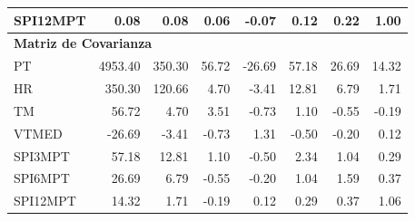 \begin{table}[ht]
\begin{tabular}{lrrrrrrr}
SPI12MPT & 0.08 & 0.08 & 0.06 & -0.07 & 0.12 & 0.22 & 1.00 \\
\midrule
\multicolumn{8}{l}{\textbf{Matriz de Covarianza}} \\
\midrule
PT       & 4953.40 & 350.30 & 56.72 & -26.69 & 57.18 & 26.69 & 14.32 \\
HR       & 350.30 & 120.66 & 4.70 & -3.41 & 12.81 & 6.79 & 1.71 \\
TM       & 56.72 & 4.70 & 3.51 & -0.73 & 1.10 & -0.55 & -0.19 \\
VTMED    & -26.69 & -3.41 & -0.73 & 1.31 & -0.50 & -0.20 & 0.12 \\
SPI3MPT  & 57.18 & 12.81 & 1.10 & -0.50 & 2.34 & 1.04 & 0.29 \\
SPI6MPT  & 26.69 & 6.79 & -0.55 & -0.20 & 1.04 & 1.59 & 0.37 \\
SPI12MPT & 14.32 & 1.71 & -0.19 & 0.12 & 0.29 & 0.37 & 1.06 \\
\bottomrule
\end{tabular}
\end{table}







